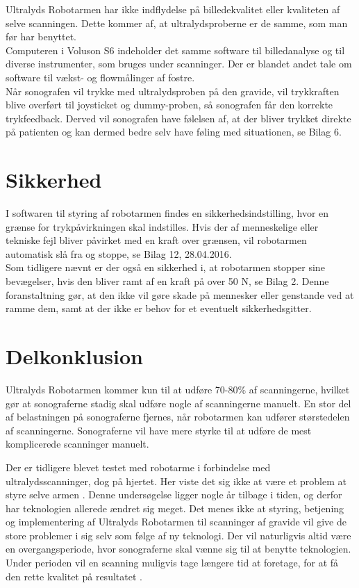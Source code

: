 Ultralyds Robotarmen har ikke indflydelse på billedekvalitet eller kvaliteten af selve scanningen. Dette kommer af, at ultralydsproberne er de samme, som man før har benyttet. \\
Computeren i Voluson S6 indeholder det samme software til billedanalyse og til diverse instrumenter, som bruges under scanninger. Der er blandet andet tale om software til vækst- og flowmålinger af fostre.   \\
Når sonografen vil trykke med ultralydsproben på den gravide, vil trykkraften blive overført til joysticket og dummy-proben, så sonografen får den korrekte trykfeedback. Derved vil sonografen have følelsen af, at der bliver trykket direkte på patienten og kan dermed bedre selv have føling med situationen, se Bilag 6. 

\section{Sikkerhed}
I softwaren til styring af robotarmen findes en sikkerhedsindstilling, hvor en grænse for trykpåvirkningen skal indstilles. Hvis der af menneskelige eller tekniske fejl bliver påvirket med en kraft over grænsen, vil robotarmen automatisk slå fra og stoppe, se Bilag 12, 28.04.2016. \\
Som tidligere nævnt er der også en sikkerhed i, at robotarmen stopper sine bevægelser, hvis den bliver ramt af en kraft på over 50 N, se Bilag 2. Denne foranstaltning gør, at den ikke vil gøre skade på mennesker eller genstande ved at ramme dem, samt at der ikke er behov for et eventuelt sikkerhedsgitter. 

\section{Delkonklusion}
Ultralyds Robotarmen kommer kun til at udføre 70-80\% af scanningerne, hvilket gør at sonograferne stadig skal udføre nogle af scanningerne manuelt. En stor del af belastningen på sonograferne fjernes, når robotarmen kan udfører størstedelen af scanningerne. Sonograferne vil have mere styrke til at udføre de mest komplicerede scanninger manuelt.

Der er tidligere blevet testet med robotarme i forbindelse med ultralydsscanninger, dog på hjertet. Her viste det sig ikke at være et problem at styre selve armen \cite{Hjerterobot}. Denne undersøgelse ligger nogle år tilbage i tiden, og derfor har teknologien allerede ændret sig meget. Det menes ikke at styring, betjening og implementering af Ultralyds Robotarmen til scanninger af gravide vil give de store problemer i sig selv som følge af ny teknologi. Der vil naturligvis altid være en overgangsperiode, hvor sonograferne skal vænne sig til at benytte teknologien. Under perioden vil en scanning muligvis tage længere tid at foretage, for at få den rette kvalitet på resultatet \cite{8}. 